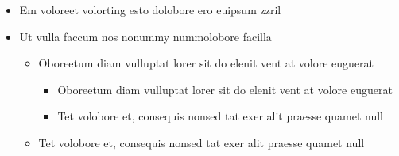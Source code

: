 \begin{itemize}
\item Em voloreet volorting esto dolobore ero euipsum zzril
\item Ut vulla faccum nos nonummy nummolobore facilla 
\begin{itemize}
\item Oboreetum diam vulluptat lorer sit do elenit vent at volore euguerat
\begin{itemize}
\item Oboreetum diam vulluptat lorer sit do elenit vent at volore euguerat
\item Tet volobore et, consequis nonsed tat exer alit praesse quamet null 
\end{itemize}
\item Tet volobore et, consequis nonsed tat exer alit praesse quamet null 
\end{itemize}
\end{itemize}

